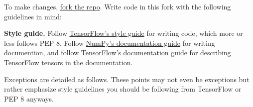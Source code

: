 To make changes,
\href{https://help.github.com/articles/working-with-forks/}{fork the repo}.
Write code in this fork with the following guidelines in mind:

\textbf{Style guide.}
Follow
\href{https://www.tensorflow.org/versions/master/how_tos/style_guide.html}{TensorFlow's
style guide}
for writing code, which more or less follows PEP 8.
Follow
\href{https://github.com/numpy/numpy/blob/master/doc/HOWTO_DOCUMENT.rst.txt}
{NumPy's documentation guide}
for writing documention,
and follow
\href{https://www.tensorflow.org/versions/master/how_tos/documentation/index.html}{TensorFlow's documentation guide}
for describing TensorFlow tensors in the documentation.

Exceptions are detailed as follows. These points may not
even be exceptions but rather emphasize style guidelines you
should be following from TensorFlow or PEP 8 anyways.

